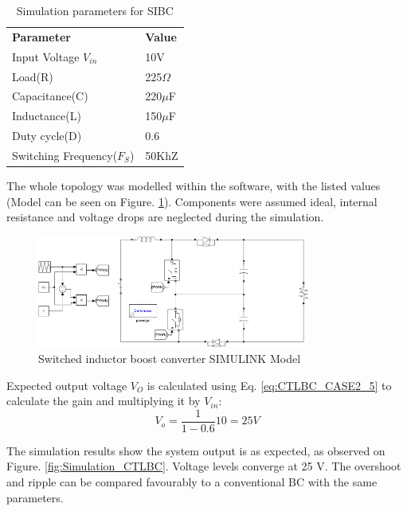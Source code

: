 \begin{table}[H]
\begin{center}
\caption {Simulation parameters for SIBC} \label{tab:CTLBC} 
\begin{tabular}{|l|l|}
\cline{1-2}
\textbf{Parameter} & \textbf{Value}  \\ \cline{1-2}
Input Voltage $V_{in}$          &      10V   \\ \cline{1-2}
Load(R)   & 225$\Omega$           \\ \cline{1-2}
Capacitance(C)          &       220$\mu$F     \\ \cline{1-2}
Inductance(L)          &      150$\mu$F      \\ \cline{1-2}
Duty cycle(D)          &     0.6       \\ \cline{1-2}
Switching Frequency($F_S$)          &      50KhZ      \\ \cline{1-2}
\end{tabular}
\end{center}
\end{table}

The whole topology was modelled within the software, with the listed values (Model can be seen on Figure. \ref{fig:Model_CTLBC}). Components were assumed ideal, internal resistance and voltage drops are neglected during the simulation. 

\begin{figure} [H]
   \centering
   \includegraphics[width=0.8\textwidth]{figures/dConventionalThreeLevelBC/Model_CTLBC.pdf}
    \caption{Switched inductor boost converter SIMULINK Model}
	\label{fig:Model_CTLBC}
\end{figure}

Expected output voltage $V_O$ is calculated using Eq. \ref{eq:CTLBC_CASE2_5} to calculate the gain and multiplying it by $V_{in}$: 
\begin{equation}
	{V_o}= \frac{1}{1-0.6}10=25V
	\label{eq:Simulation_CTLBC}
\end{equation}

The simulation results show the system output is as expected, as observed on Figure. \ref {fig:Simulation_CTLBC}. Voltage levels converge at 25 V. The overshoot and ripple can be compared favourably to a conventional BC with the same parameters. 


